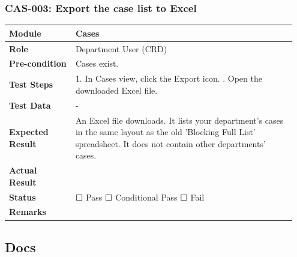 \documentclass[10pt]{article}
\begin{document}
\subsubsection*{CAS-003: Export the case list to Excel}
\begin{longtable}{p{0.22\linewidth}p{0.73\linewidth}}
\hline
\textbf{Module} & Cases \\ \hline
\textbf{Role} & Department User (CRD) \\ \hline
\textbf{Pre-condition} & Cases exist. \\ \hline
\textbf{Test Steps} & 1. In Cases view, click the Export icon. \newline 2. Open the downloaded Excel file. \\ \hline
\textbf{Test Data} & - \\ \hline
\textbf{Expected Result} & An Excel file downloads. It lists your department's cases in the same layout as the old 'Blocking Full List' spreadsheet. It does not contain other departments' cases. \\ \hline
\textbf{Actual Result} & \newline \newline \\ \hline
\textbf{Status} & ☐ Pass \quad ☐ Conditional Pass \quad ☐ Fail \\ \hline
\textbf{Remarks} & \newline \\ \hline
\end{longtable}
\subsection{Docs}
\end{document}
